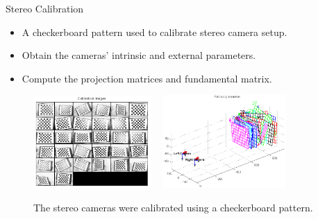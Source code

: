 \documentclass{beamer}
\begin{document}
\begin{frame}{Stereo Calibration}

\begin{itemize}
\setlength\itemsep{0.5em}
\item A checkerboard pattern used to calibrate stereo camera setup.
\item Obtain the cameras' intrinsic and external parameters.
\item Compute the projection matrices and fundamental matrix.
\end{itemize}

\begin{center}
\begin{figure}
\includegraphics[width=0.4\textwidth]{img/checkerboard} ~
\includegraphics[width=0.42\textwidth]{img/calib}
\caption{\tiny{The stereo cameras were calibrated using a checkerboard pattern.}}
\end{figure}
\end{center}

\end{frame}
\end{document}

